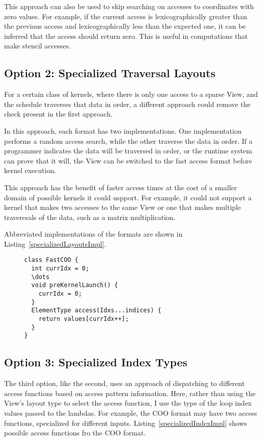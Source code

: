 This approach can also be used to skip searching on accesses to coordinates with zero values.
For example, if the current access is lexicographically greater than the previous access and lexicographically less than the expected one, it can be inferred that the access should return zero. This is useful in computations that make stencil accesses.

\subsection{Option 2: Specialized Traversal Layouts}
For a certain class of kernels, where there is only one access to a sparse View, and the schedule traverses that data in order, a different approach could remove the check present in the first approach.

In this approach, each format has two implementations. 
One implementation performs a random access search, while the other traverse the data in order. 
If a programmer indicates the data will be traversed in order, or the runtime system can prove that it will, the View can be switched to the fast access format before kernel execution.

This approach has the benefit of faster access times at the cost of a smaller domain of possible kernels it could uspport. 
For example, it could not support a kernel that makes two accesses to the same View or one that makes multiple traveresals of the data, such as a matrix multiplication.

Abbreviated implementations of the formats are shown in Listing~\ref{specializedLayoutsImpl}.
\begin{figure}
\begin{lstlisting}[caption={Abbreviated format implementation for the Specialized Traversal Layout approach.},label=specializedLayoutsImpl]
class FastCOO {
  int currIdx = 0;
  \dots
  void preKernelLaunch() {
    currIdx = 0;
  }
  ElementType access(Idxs...indices) {
    return values[currIdx++];
  }
}
\end{lstlisting}
\end{figure}

\subsection{Option 3: Specialized Index Types}
The third option, like the second, uses an approach of dispatching to different access functions based on access pattern information.
Here, rather than using the View's layout type to select the access function, I use the type of the loop index values passed to the lambdas.
For example, the COO format may have two access functions, specialized for different inputs.
Listing~\ref{specializedIndexImpl} shows possible access functions fro the COO format.

